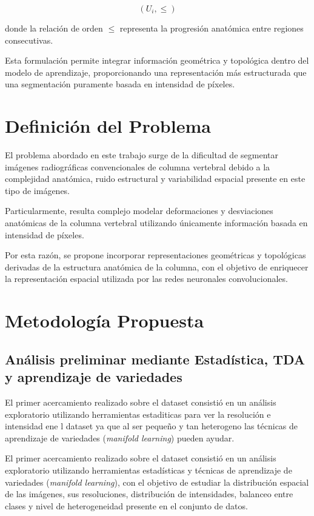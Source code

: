 \documentclass[conference]{IEEEtran}
\begin{document}
\[
(U_i, \leq)
\]

donde la relación de orden $\leq$ representa la progresión anatómica entre regiones consecutivas.

Esta formulación permite integrar información geométrica y topológica dentro del modelo de aprendizaje, proporcionando una representación más estructurada que una segmentación puramente basada en intensidad de píxeles.


\section{Definición del Problema}

El problema abordado en este trabajo surge de la dificultad de segmentar imágenes radiográficas convencionales de columna vertebral debido a la complejidad anatómica, ruido estructural y variabilidad espacial presente en este tipo de imágenes.

Particularmente, resulta complejo modelar deformaciones y desviaciones anatómicas de la columna vertebral utilizando únicamente información basada en intensidad de píxeles.

Por esta razón, se propone incorporar representaciones geométricas y topológicas derivadas de la estructura anatómica de la columna, con el objetivo de enriquecer la representación espacial utilizada por las redes neuronales convolucionales.

\section{Metodología Propuesta}

\subsection{Análisis preliminar mediante Estadística, TDA y aprendizaje de variedades}
El primer acercamiento realizado sobre el dataset consistió en un análisis exploratorio utilizando herramientas estaditicas para ver la resolución e intensidad ene l dataset ya que al ser pequeño y tan heterogeno las técnicas de aprendizaje de variedades (\textit{manifold learning})
pueden ayudar.


El primer acercamiento realizado sobre el dataset consistió en un análisis exploratorio utilizando herramientas estadísticas y técnicas de aprendizaje de variedades (\textit{manifold learning}), con el objetivo de estudiar la distribución espacial de las imágenes, sus resoluciones, distribución de intensidades, balanceo entre clases y nivel de heterogeneidad presente en el conjunto de datos.
\end{document}
